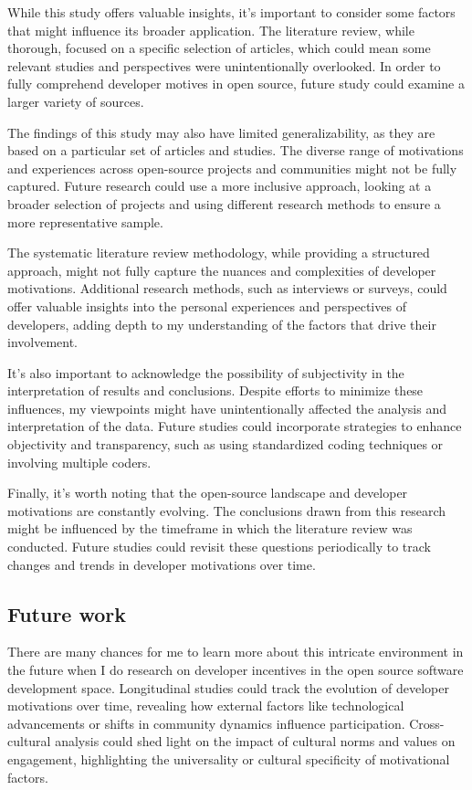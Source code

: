 While this study offers valuable insights, it's important to consider some factors that might influence its broader application. The literature review, while thorough, focused on a specific selection of articles, which could mean some relevant studies and perspectives were unintentionally overlooked. In order to fully comprehend developer motives in open source, future study could examine a larger variety of sources.


The findings of this study may also have limited generalizability, as they are based on a particular set of articles and studies. The diverse range of motivations and experiences across open-source projects and communities might not be fully captured. Future research could use a more inclusive approach, looking at a broader selection of projects and using different research methods to ensure a more representative sample.

The systematic literature review methodology, while providing a structured approach, might not fully capture the nuances and complexities of developer motivations. Additional research methods, such as interviews or surveys, could offer valuable insights into the personal experiences and perspectives of developers, adding depth to my understanding of the factors that drive their involvement.

It's also important to acknowledge the possibility of subjectivity in the interpretation of results and conclusions. Despite efforts to minimize these influences, my viewpoints might have unintentionally affected the analysis and interpretation of the data. Future studies could incorporate strategies to enhance objectivity and transparency, such as using standardized coding techniques or involving multiple coders.

Finally, it's worth noting that the open-source landscape and developer motivations are constantly evolving. The conclusions drawn from this research might be influenced by the timeframe in which the literature review was conducted. Future studies could revisit these questions periodically to track changes and trends in developer motivations over time.


\subsection{Future work}

There are many chances for me to learn more about this intricate environment in the future when I do research on developer incentives in the open source software development space. Longitudinal studies could track the evolution of developer motivations over time, revealing how external factors like technological advancements or shifts in community dynamics influence participation.  Cross-cultural analysis could shed light on the impact of cultural norms and values on engagement, highlighting the universality or cultural specificity of motivational factors.

